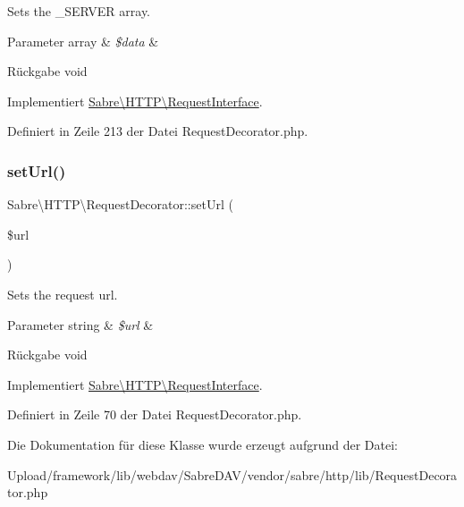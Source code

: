 Sets the \+\_\+\+S\+E\+R\+V\+ER array.


\begin{DoxyParams}[1]{Parameter}
array & {\em \$data} & \\
\hline
\end{DoxyParams}
\begin{DoxyReturn}{Rückgabe}
void 
\end{DoxyReturn}


Implementiert \mbox{\hyperlink{interface_sabre_1_1_h_t_t_p_1_1_request_interface_a025c72064e34e843a8fd402e6407894c}{Sabre\textbackslash{}\+H\+T\+T\+P\textbackslash{}\+Request\+Interface}}.



Definiert in Zeile 213 der Datei Request\+Decorator.\+php.

\mbox{\label{class_sabre_1_1_h_t_t_p_1_1_request_decorator_a7cb8a935719f2e497d30a8aabdef58b2}} 
\subsubsection{\texorpdfstring{set\+Url()}{setUrl()}}
{\footnotesize\ttfamily Sabre\textbackslash{}\+H\+T\+T\+P\textbackslash{}\+Request\+Decorator\+::set\+Url (\begin{DoxyParamCaption}\item[{}]{\$url }\end{DoxyParamCaption})}

Sets the request url.


\begin{DoxyParams}[1]{Parameter}
string & {\em \$url} & \\
\hline
\end{DoxyParams}
\begin{DoxyReturn}{Rückgabe}
void 
\end{DoxyReturn}


Implementiert \mbox{\hyperlink{interface_sabre_1_1_h_t_t_p_1_1_request_interface_aa588eaadc450324b11562119bb1933a0}{Sabre\textbackslash{}\+H\+T\+T\+P\textbackslash{}\+Request\+Interface}}.



Definiert in Zeile 70 der Datei Request\+Decorator.\+php.



Die Dokumentation für diese Klasse wurde erzeugt aufgrund der Datei\+:\begin{DoxyCompactItemize}
\item 
Upload/framework/lib/webdav/\+Sabre\+D\+A\+V/vendor/sabre/http/lib/Request\+Decorator.\+php\end{DoxyCompactItemize}
